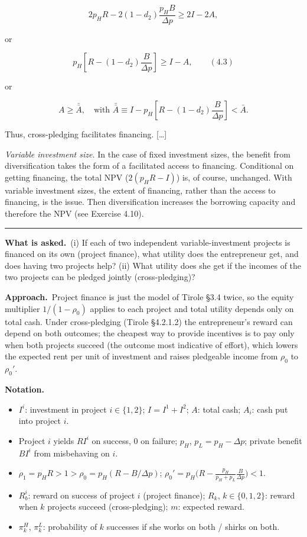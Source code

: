 \documentclass[11pt,a4paper]{article}
\newcommand{\notation}{\par\noindent\textbf{Notation.}}
\newcommand{\asked}{\par\medskip\noindent\textbf{What is asked.}~}
\newcommand{\approach}{\par\smallskip\noindent\textbf{Approach.}~}
\newcommand{\stmtend}{\par\endgroup\nopagebreak\noindent\rule{\linewidth}{0.4pt}\par\medskip}
\begin{document}
\[2 p_H R - 2(1 - d_2) \frac{p_H B}{\Delta p} \geqslant 2I - 2A,\]

or

\[p_H\left[R - (1 - d_2) \frac{B}{\Delta p}\right] \geqslant I - A, \qquad (4.3)\]

or

\[A \geqslant \bar{\bar A}, \quad \text{with } \bar{\bar A} \equiv I - p_H\left[R - (1 - d_2) \frac{B}{\Delta p}\right] < \bar A.\]

Thus, cross-pledging facilitates financing. {[}\ldots{]}

\emph{Variable investment size.} In the case of fixed investment sizes, the benefit from
diversification takes the form of a facilitated access to financing. Conditional on getting
financing, the total NPV (\(2(p_H R - I)\)) is, of course, unchanged. With variable investment
sizes, the extent of financing, rather than the access to financing, is the issue. Then
diversification increases the borrowing capacity and therefore the NPV (see Exercise 4.10).
\stmtend

\asked (i) If each of two independent variable-investment projects is financed on its own
(project finance), what utility does the entrepreneur get, and does having two projects help?
(ii) What utility does she get if the incomes of the two projects can be pledged jointly
(cross-pledging)?

\approach Project finance is just the model of Tirole \S3.4 twice, so the equity multiplier
$1/(1-\rho_0)$ applies to each project and total utility depends only on total cash. Under
cross-pledging (Tirole \S4.2.1.2) the entrepreneur's reward can depend on both outcomes; the
cheapest way to provide incentives is to pay only when both projects succeed (the outcome most
indicative of effort), which lowers the expected rent per unit of investment and raises
pledgeable income from $\rho_0$ to $\rho_0'$.

\notation
\begin{itemize}
  \item $I^i$: investment in project $i\in\{1,2\}$; $I=I^1+I^2$; $A$: total cash; $A_i$: cash put into project $i$.
  \item Project $i$ yields $RI^i$ on success, $0$ on failure; $p_H$, $p_L=p_H-\Delta p$; private benefit $BI^i$ from misbehaving on $i$.
  \item $\rho_1=p_HR>1>\rho_0=p_H(R-B/\Delta p)$; $\rho_0'=p_H\big(R-\frac{p_H}{p_H+p_L}\frac{B}{\Delta p}\big)<1$.
  \item $R_b^i$: reward on success of project $i$ (project finance); $R_k$, $k\in\{0,1,2\}$: reward when $k$ projects succeed (cross-pledging); $m$: expected reward.
  \item $\pi_k^H$, $\pi_k^L$: probability of $k$ successes if she works on both / shirks on both.
\end{itemize}
\end{document}
